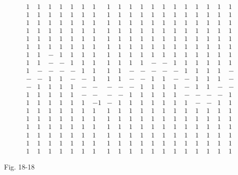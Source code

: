 \documentclass[10pt]{article}
\begin{document}
$$
\begin{array}{lllllllllllllllllll}
1 & 1 & 1 & 1 & 1 & 1 & 1 & 1 & 1 & 1 & 1 & 1 & 1 & 1 & 1 & 1 & 1 & 1 & 1 \\
1 & 1 & 1 & 1 & 1 & 1 & 1 & 1 & 1 & 1 & 1 & 1 & 1 & 1 & 1 & 1 & 1 & 1 & 1 \\
1 & 1 & 1 & 1 & 1 & 1 & 1 & 1 & 1 & 1 & 1 & 1 & 1 & 1 & 1 & 1 & 1 & 1 & 1 \\
1 & 1 & 1 & 1 & 1 & 1 & 1 & 1 & 1 & 1 & 1 & 1 & 1 & 1 & 1 & 1 & 1 & 1 & 1 \\
1 & 1 & 1 & 1 & 1 & 1 & 1 & 1 & 1 & 1 & 1 & 1 & 1 & 1 & 1 & 1 & 1 & 1 & 1 \\
1 & 1 & 1 & 1 & 1 & 1 & 1 & 1 & 1 & 1 & 1 & 1 & 1 & 1 & 1 & 1 & 1 & 1 & 1 \\
1 & 1 & - & 1 & 1 & 1 & 1 & 1 & 1 & 1 & 1 & 1 & 1 & 1 & 1 & 1 & 1 & 1 & 1 \\
1 & 1 & - & - & 1 & 1 & 1 & 1 & 1 & 1 & 1 & - & - & 1 & 1 & 1 & 1 & 1 & 1 \\
1 & - & - & - & - & 1 & 1 & 1 & 1 & - & - & - & - & - & 1 & 1 & 1 & 1 & - \\
- & - & 1 & 1 & - & - & 1 & 1 & 1 & - & - & 1 & 1 & - & - & 1 & 1 & 1 & - \\
- & 1 & 1 & 1 & 1 & - & - & - & - & - & 1 & 1 & 1 & 1 & - & 1 & 1 & - & - \\
1 & 1 & 1 & 1 & 1 & - & - & - & - & 1 & 1 & 1 & 1 & 1 & - & - & - & - & 1 \\
1 & 1 & 1 & 1 & 1 & 1 & -1 & - & 1 & 1 & 1 & 1 & 1 & 1 & 1 & - & - & 1 & 1 \\
1 & 1 & 1 & 1 & 1 & 1 & 1 & 1 & 1 & 1 & 1 & 1 & 1 & 1 & 1 & 1 & 1 & 1 & 1 \\
1 & 1 & 1 & 1 & 1 & 1 & 1 & 1 & 1 & 1 & 1 & 1 & 1 & 1 & 1 & 1 & 1 & 1 & 1 \\
1 & 1 & 1 & 1 & 1 & 1 & 1 & 1 & 1 & 1 & 1 & 1 & 1 & 1 & 1 & 1 & 1 & 1 & 1 \\
1 & 1 & 1 & 1 & 1 & 1 & 1 & 1 & 1 & 1 & 1 & 1 & 1 & 1 & 1 & 1 & 1 & 1 & 1 \\
1 & 1 & 1 & 1 & 1 & 1 & 1 & 1 & 1 & 1 & 1 & 1 & 1 & 1 & 1 & 1 & 1 & 1 & 1 \\
1 & 1 & 1 & 1 & 1 & 1 & 1 & 1 & 1 & 1 & 1 & 1 & 1 & 1 & 1 & 1 & 1 & 1 & 1
\end{array}
$$

Fig. 18-18
\end{document}
